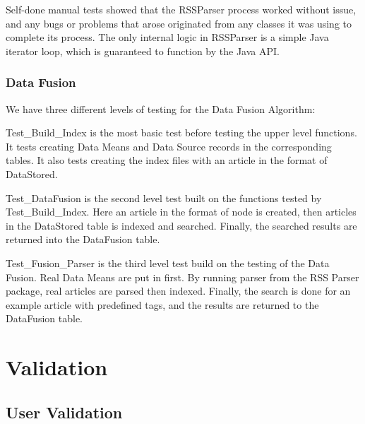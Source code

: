 \documentclass[11pt]{article} %
\begin{document}
Self-done manual tests showed that the RSSParser process worked without issue, and any bugs or problems that arose originated from any classes it was using to complete its process. The only internal logic in RSSParser is a simple Java iterator loop, which is guaranteed to function by the Java API.

\subsubsection{Data Fusion}

We have three different levels of testing for the Data Fusion Algorithm:

Test\_Build\_Index is the most basic test before testing the upper level functions. It tests creating Data Means and Data Source records in the corresponding tables. It also tests creating the index files with an article in the format of DataStored.

Test\_DataFusion is the second level test built on the functions tested by Test\_Build\_Index. Here an article in the format of node is created, then articles in the DataStored table is indexed and searched. Finally, the searched results are returned into the DataFusion table.

Test\_Fusion\_Parser is the third level test build on the testing of the Data Fusion. Real Data Means are put in first. By running parser from the RSS Parser package, real articles are parsed then indexed. Finally, the search is done for an example article with predefined tags, and the results are returned to the DataFusion table. 

\section{Validation}

\subsection{User Validation}
\end{document}
